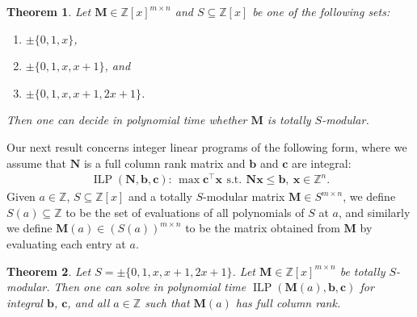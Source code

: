 \documentclass[a4paper, 11pt]{article}
\DeclareMathOperator{\ILP}{ILP}
\newcommand{\Z}{\mathbb{Z}}
\newcommand{\bx}{\bm{x}}
\newcommand{\bc}{\bm{c}}
\newcommand{\bb}{\bm{b}}
\newcommand{\bM}{\bm{M}}
\newcommand{\bN}{\bm{N}}
\newcommand{\indet}{x}
\newcommand{\intvar}{a}
\newcommand{\polyring}{\Z[\indet]}
\newcommand{\polyS}{S}
\newtheorem{theorem}{Theorem}
\begin{document}
	\begin{theorem}\label{thm_recognition_polyring}
		Let $\bM\in \polyring^{m\times n}$ and $\polyS\subseteq \polyring$ be one of the following sets:
		\begin{enumerate}
			\item $\pm \lbrace 0,1,\indet\rbrace$, 
			\item $\pm \lbrace 0,1,\indet,\indet + 1\rbrace$, and
			\item $\pm \lbrace 0,1,\indet,\indet + 1, 2\indet + 1\rbrace$.
		\end{enumerate} 
		Then one can decide in polynomial time whether $\bM$ is totally $\polyS$-modular.
	\end{theorem}
	Our next result concerns integer linear programs of the following form, where we assume that $\bN$ is a full column rank matrix and $\bb$ and $\bc$ are integral:
	\begin{align*}
		\ILP(\bN,\bb,\bc): \,\max \bc^\top\bx\, \ \text{s.t.}\, \ \bN\bx\leq\bb, \ \bx\in\Z^n.
	\end{align*}
	Given $\intvar\in\Z$, $\polyS\subseteq\polyring$ and a totally $\polyS$-modular matrix $\bM\in \polyS^{m\times n}$, we define
$\polyS(\intvar)\subseteq\Z$ to be the set of evaluations of all polynomials
of $\polyS$ at $\intvar$, and similarly we define $\bM(\intvar)\in(\polyS(\intvar))^{m\times n}$
to be the matrix obtained from $\bM$ by evaluating each entry at $\intvar$.
		
	\begin{theorem}\label{thm_opt_polyring}
		Let $\polyS = \pm \lbrace 0,1,\indet,\indet + 1, 2\indet + 1\rbrace$. Let $\bM\in \polyring^{m\times n}$ be totally $\polyS$-modular. Then one can solve in polynomial time $\ILP(\bM(\intvar),\bb,\bc)$ for integral $\bb$, $\bc$, and all $\intvar\in\Z$ such that $\bM(\intvar)$ has full column rank.
	\end{theorem}
	
\end{document}
